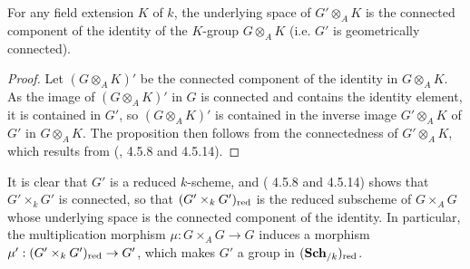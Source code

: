 \begin{proposition}\label{scheme A-group connected component is geometric}
For any field extension $K$ of $k$, the underlying space of $G'\otimes_AK$ is the connected component of the identity of the $K$-group $G\otimes_AK$ (i.e. $G'$ is geometrically connected). 
\end{proposition}
\begin{proof}
Let $(G\otimes_AK)'$ be the connected component of the identity in $G\otimes_AK$. As the image of $(G\otimes_AK)'$ in $G$ is connected and contains the identity element, it is contained in $G'$, so $(G\otimes_AK)'$ is contained in the inverse image $G'\otimes_AK$ of $G'$ in $G\otimes_AK$. The proposition then follows from the connectedness of $G'\otimes_AK$, which results from (\cite{EGA4-2}, 4.5.8 and 4.5.14).
\end{proof}

It is clear that $G'$ is a reduced $k$-scheme, and (\cite{EGA4-2} 4.5.8 and 4.5.14) shows that $G'\times_kG'$ is connected, so that $(G'\times_kG')_{\mathrm{red}}$ is the reduced subscheme of $G\times_AG$ whose underlying space is the connected component of the identity. In particular, the multiplication morphism $\mu:G\times_AG\to G$ induces a morphism $\mu':(G'\times_kG')_{\mathrm{red}}\to G'$, which makes $G'$ a group in $(\mathbf{Sch}_{/k})_{\mathrm{red}}$.

